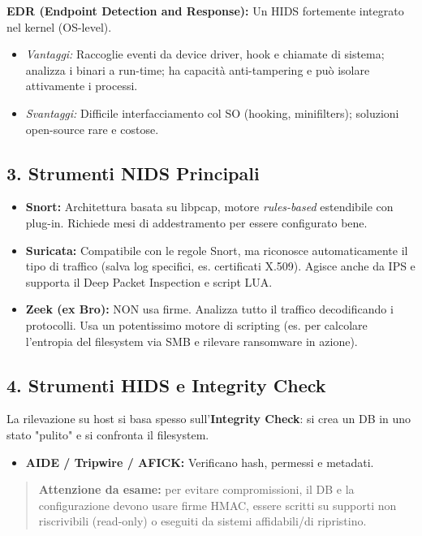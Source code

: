 \documentclass[12pt, a4paper]{report}
\begin{document}
\textbf{EDR (Endpoint Detection and Response):} Un HIDS fortemente integrato nel kernel (OS-level).
\begin{itemize}
	\item \textit{Vantaggi:} Raccoglie eventi da device driver, hook e chiamate di sistema; analizza i binari a run-time; ha capacità anti-tampering e può isolare attivamente i processi.
	\item \textit{Svantaggi:} Difficile interfacciamento col SO (hooking, minifilters); soluzioni open-source rare e costose.
\end{itemize}

\subsection{3. Strumenti NIDS Principali}
\begin{itemize}
	\item \textbf{Snort:} Architettura basata su libpcap, motore \textit{rules-based} estendibile con plug-in. Richiede mesi di addestramento per essere configurato bene.
	\item \textbf{Suricata:} Compatibile con le regole Snort, ma riconosce automaticamente il tipo di traffico (salva log specifici, es. certificati X.509). Agisce anche da IPS e supporta il Deep Packet Inspection e script LUA.
	\item \textbf{Zeek (ex Bro):} NON usa firme. Analizza tutto il traffico decodificando i protocolli. Usa un potentissimo motore di scripting (es. per calcolare l'entropia del filesystem via SMB e rilevare ransomware in azione).
\end{itemize}

\subsection{4. Strumenti HIDS e Integrity Check}
La rilevazione su host si basa spesso sull'\textbf{Integrity Check}: si crea un DB in uno stato "pulito" e si confronta il filesystem.

\begin{itemize}
	\item \textbf{AIDE / Tripwire / AFICK:} Verificano hash, permessi e metadati.
\end{itemize}

\begin{quote}
	\textbf{Attenzione da esame:} per evitare compromissioni, il DB e la configurazione devono usare firme HMAC, essere scritti su supporti non riscrivibili (read-only) o eseguiti da sistemi affidabili/di ripristino.
\end{quote}
\end{document}
